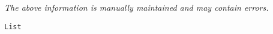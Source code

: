 \label{pkg:list}

{\tiny \it The above information is manually maintained and may contain errors.}
\begin{verbatim}
List
\end{verbatim}
